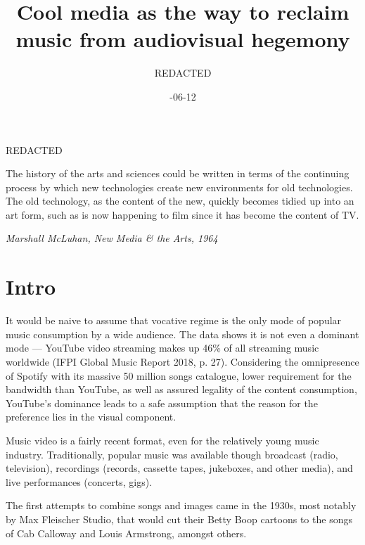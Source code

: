 \documentclass[a4paper, 11pt]{article}
\begin{document}
\begin{titlepage}
	\title{\textbf{Cool media as the way to reclaim \\music from audiovisual hegemony}}
	\author{REDACTED}
	\date{-06-12}
	\maketitle
	\thispagestyle{empty}
	\centering
	\vfill
	REDACTED
	\newpage
\end{titlepage}





\epigraph{
	The history of the arts and sciences could be written in terms of the continuing process by which new technologies create new environments for old technologies. The old technology, as the content of the new, quickly becomes tidied up into an art form, such as is now happening to film since it has become the content of TV.}{\textit{Marshall McLuhan, New Media \& the Arts, 1964}}

\onehalfspacing


\section{Intro}
It would be naive to assume that vocative regime is the only mode of popular music consumption by a wide audience. The data shows it is not even a dominant mode — YouTube video streaming makes up 46\% of all streaming music worldwide (IFPI Global Music Report 2018, p. 27). Considering the omnipresence of Spotify with its massive 50 million songs catalogue, lower requirement for the bandwidth than YouTube, as well as assured legality of the content consumption, YouTube's dominance leads to a safe assumption that the reason for the preference lies in the visual component.


Music video is a fairly recent format, even for the relatively young music industry. Traditionally, popular music was available though broadcast (radio, television), recordings (records, cassette tapes, jukeboxes, and other media), and live performances (concerts, gigs).

The first attempts to combine songs and images came in the 1930s, most notably by Max Fleischer Studio, that would cut their Betty Boop cartoons to the songs of Cab Calloway and Louis Armstrong, amongst others.
\end{document}

